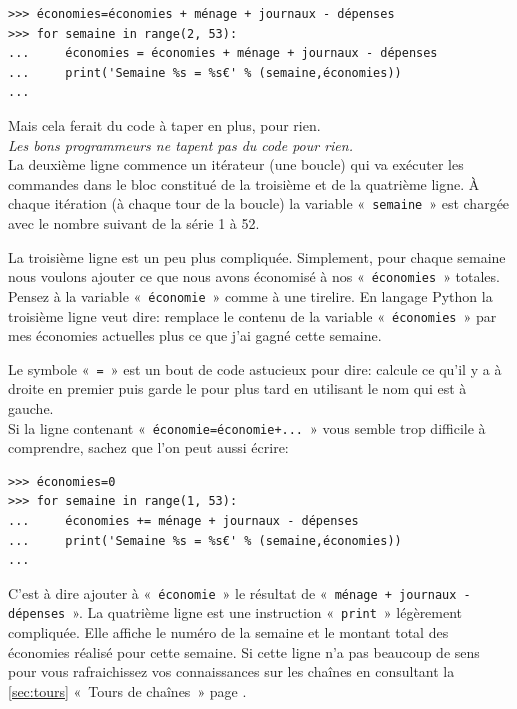\begin{Verbatim}[frame=single,rulecolor=\color{gray}, label=moche]
>>> économies=économies + ménage + journaux - dépenses
>>> for semaine in range(2, 53):
...     économies = économies + ménage + journaux - dépenses
...     print('Semaine %s = %s€' % (semaine,économies))
... 
\end{Verbatim}

Mais cela ferait du code à taper en plus, pour rien.\\

\emph{Les bons programmeurs ne tapent pas du code pour rien.}\\



La deuxième ligne commence un itérateur (une boucle) qui va exécuter les commandes dans le bloc constitué de la troisième et de la quatrième ligne. À chaque itération (à chaque tour de la boucle) la variable «~\texttt{semaine}~» est chargée avec le nombre suivant de la série 1 à 52.

La troisième ligne est un peu plus compliquée. Simplement, pour chaque semaine nous voulons ajouter ce que nous avons économisé à nos «~\texttt{économies}~» totales. Pensez à la variable «~\texttt{économie}~» comme à une tirelire. En langage Python la troisième ligne veut dire: remplace le contenu de la variable «~\texttt{économies}~» par mes économies actuelles plus ce que j'ai gagné cette semaine.

Le symbole «~\texttt{=}~» est un bout de code astucieux pour dire: calcule ce qu'il y a à droite en premier puis garde le pour plus tard en utilisant le nom qui est à gauche.\\

Si la ligne contenant «~\texttt{économie=économie+...}~» vous semble trop difficile à comprendre, sachez que l'on peut aussi écrire:

\begin{Verbatim}[frame=single,rulecolor=\color{mbleu}, label=à taper]
>>> économies=0
>>> for semaine in range(1, 53):
...     économies += ménage + journaux - dépenses
...     print('Semaine %s = %s€' % (semaine,économies))
... 
\end{Verbatim}

C'est à dire ajouter à «~\texttt{économie}~» le résultat de «~\texttt{ménage + journaux - dépenses}~». La quatrième ligne est une instruction «~\texttt{print}~» légèrement compliquée. Elle affiche le numéro de la semaine et le montant total des économies réalisé pour cette semaine. Si cette ligne n'a pas beaucoup de sens pour vous rafraichissez vos connaissances sur les chaînes en consultant la \autoref{sec:tours} «~Tours de chaînes~»  page \pageref{sec:tours}.

